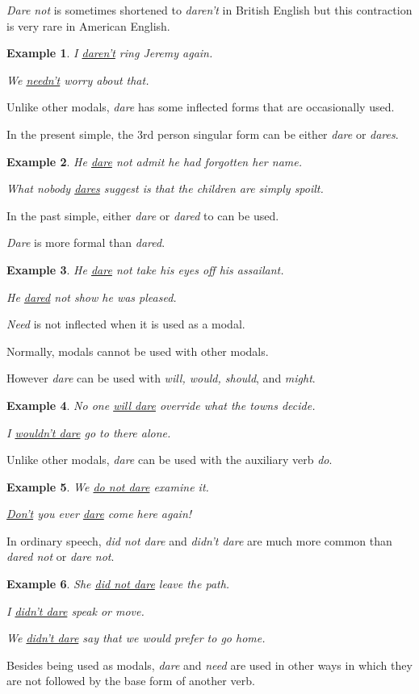 \documentclass[oneside]{book}
\numberwithin{equation}{section}
\newtheorem{example}{Example}[section]
\begin{document}
\textit{Dare not} is sometimes shortened to \textit{daren't} in British English but this contraction is very rare in American English.
\begin{example}
    I \underline{daren't} ring Jeremy again.
    
    We \underline{needn't} worry about that.
\end{example}
%
\noindent{} Unlike other modals, \textit{dare} has some inflected forms that are occasionally used.

%
In the present simple, the 3rd person singular form can be either \textit{dare} or \textit{dares}.
\begin{example}
    He \underline{dare} not admit he had forgotten her name.
    
    What nobody \underline{dares} suggest is that the children are simply spoilt.
\end{example}
In the past simple, either \textit{dare} or \textit{dared} to can be used.

\textit{Dare} is more formal than \textit{dared}.
\begin{example}
    He \underline{dare} not take his eyes off his assailant.
    
    He \underline{dared} not show he was pleased.
\end{example}
\textit{Need} is not inflected when it is used as a modal.

%
\noindent{} Normally, modals cannot be used with other modals.

However \textit{dare} can be used with \textit{will, would, should}, and \textit{might}.
\begin{example}
    No one \underline{will dare} override what the towns decide.
    
    I \underline{wouldn't dare} go to there alone.
\end{example}
%
\noindent{} Unlike other modals, \textit{dare} can be used with the auxiliary verb \textit{do}.
\begin{example}
    We \underline{do not dare} examine it.
    
    \underline{Don't} you ever \underline{dare} come here again!
\end{example}
In ordinary speech, \textit{did not dare} and \textit{didn't dare} are much more common than \textit{dared not} or \textit{dare not}.
\begin{example}
    She \underline{did not dare} leave the path.
    
    I \underline{didn't dare} speak or move.
    
    We \underline{didn't dare} say that we would prefer to go home.
\end{example}
%
\noindent{} Besides being used as modals, \textit{dare} and \textit{need} are used in other ways in which they are not followed by the base form of another verb.
\end{document}
